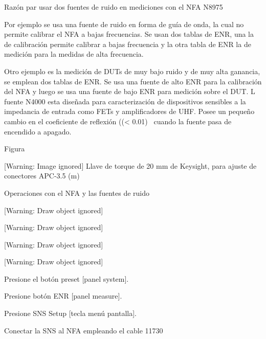 \documentclass{article}
\newcounter{Drawing}
\renewcommand\theDrawing{\arabic{Drawing}}
\begin{document}
Razón par usar dos fuentes de ruido en mediciones con el NFA N8975

Por ejemplo se usa una fuente de ruido en forma de guía de onda, la cual no permite calibrar el NFA a bajas frecuencias. Se usan dos tablas de ENR, una la de calibración permite calibrar a bajas frecuencia y la otra tabla de ENR la de medición para la medidas de alta frecuencia.

Otro ejemplo es la medición de DUTs de muy bajo ruido y de muy alta ganancia, se emplean dos tablas de ENR. Se usa una fuente de alto ENR para la calibración del NFA y luego se usa una fuente de bajo ENR para medición sobre el DUT. L fuente N4000 esta diseñada para caracterización de dispositivos sensibles a la impedancia de entrada como FETs y amplificadores de UHF. Posee un pequeño cambio en el coeficiente de reflexión (({\textless} 0.01) \ cuando la fuente pasa de encendido a apagado.

\begin{center}
\begin{minipage}{14.88cm}
Figura \stepcounter{Drawing}{\theDrawing}

 [Warning: Image ignored] %
Llave de torque de 20 mm de Keysight, para ajuste de conectores APC-3.5 (m)
\end{minipage}
\end{center}
Operaciones con el NFA y las fuentes de ruido

[Warning: Draw object ignored]

[Warning: Draw object ignored]




[Warning: Draw object ignored]


\bigskip

[Warning: Draw object ignored]


\bigskip


\bigskip


\bigskip


\bigskip


\bigskip


\bigskip


\bigskip

Presione el botón preset [panel system]. 

Presione botón ENR [panel measure]. 

Presione SNS Setup [tecla menú pantalla]. 

Conectar la SNS al NFA empleando el cable 11730
\end{document}
